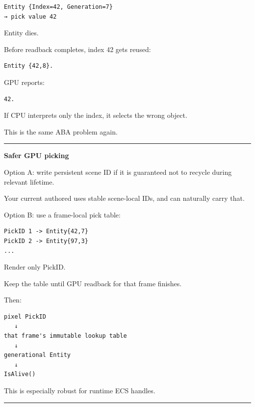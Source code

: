 \begin{verbatim}
Entity {Index=42, Generation=7}
→ pick value 42
\end{verbatim}

Entity dies.

Before readback completes, index 42 gets reused:

\begin{verbatim}
Entity {42,8}.
\end{verbatim}

GPU reports:

\begin{verbatim}
42.
\end{verbatim}

If CPU interprets only the index, it selects the wrong object.

This is the same ABA problem again.

\begin{center}\rule{0.5\linewidth}{0.5pt}\end{center}

\textbf{Safer GPU picking}

Option A: write persistent scene ID if it is guaranteed not to recycle during relevant lifetime.

Your current authored  uses stable scene-local  IDs, and  can naturally carry that.

Option B: use a frame-local pick table:

\begin{verbatim}
PickID 1 -> Entity{42,7}
PickID 2 -> Entity{97,3}
...
\end{verbatim}

Render only PickID.

Keep the table until GPU readback for that frame finishes.

Then:

\begin{verbatim}
pixel PickID
   ↓
that frame's immutable lookup table
   ↓
generational Entity
   ↓
IsAlive()
\end{verbatim}

This is especially robust for runtime ECS handles.

\begin{center}\rule{0.5\linewidth}{0.5pt}\end{center}

